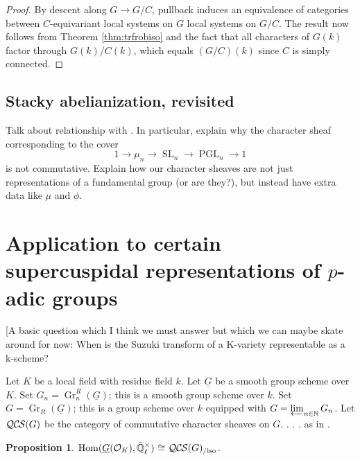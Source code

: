 \documentclass[10pt]{amsart}
\theoremstyle{plain}
\newtheorem{proposition}[theorem]{Proposition}
\theoremstyle{definition}
\newcommand{\NN}{{\mathbb{N}}}
\newcommand{\EE}{\mathbb{\bar Q}_\ell}
\newcommand{\OK}{\mathcal{O}_K}
\newcommand{\Fq}{k}
\newcommand{\EEx}{\EE^\times}
\DeclareMathOperator{\Hom}{Hom}
\DeclareMathOperator{\Gr}{Gr}
\DeclareMathOperator{\SL}{SL}
\DeclareMathOperator{\PGL}{PGL}
\newcommand{\iso}{{\ \cong\ }}
\newcommand{\QCS}{{\mathcal{QC\hskip-0.8pt S}}}
\newcommand{\QCSiso}[1]{\QCS(#1)_{/\text{iso}}}
\begin{document}
 \begin{proof}
 By descent along $G \to G/C$, pullback induces an equivalence of categories between $C$-equivariant local systems on $G$ local systems on  $G/C$. 
  The result now follows from Theorem \ref{thm:trfrobiso} and the fact that all characters of $G(\Fq)$ factor through
 $G(\Fq)/C(\Fq)$, which equals $(G/C)(\Fq)$ since $C$ is simply connected.
 \end{proof}
 
\subsection{Stacky abelianization, revisited}
 
 Talk about relationship with \cite{kamgarpour:09a}.  In particular, explain why the character sheaf corresponding
 to the cover
 \[
 1 \to \mu_n \to \SL_n \to \PGL_n \to 1
 \]
 is not commutative.  Explain how our character sheaves are not just representations of a fundamental group
 (or are they?), but instead have extra data like $\mu$ and $\phi$.



\section{Application to certain supercuspidal representations of $p$-adic groups}

[A basic question which I think we must answer but which we can maybe skate around for now:
When is the Suzuki transform of a K-variety representable as a k-scheme?


Let $K$ be a local field with residue field $\Fq$.
Let $\underline{G}$ be a smooth group scheme over $K$.
Set $G_n = \Gr^R_n(\underline{G})$; this is a smooth group scheme over $\Fq$.
Set $G = \Gr_R(\underline{G})$; this is a group scheme over $\Fq$ equipped with $G = \varprojlim_{n\in \NN} G_n$.
Let $\QCS(G)$ be the category of commutative character sheaves on $G$. . . .  as in \cite{cunningham-roe:13a}.

\begin{proposition}\label{prop:QCS}
$\Hom(\underline{G}(\OK),\EEx) \iso \QCSiso{G}$.
\end{proposition}
\end{document}
